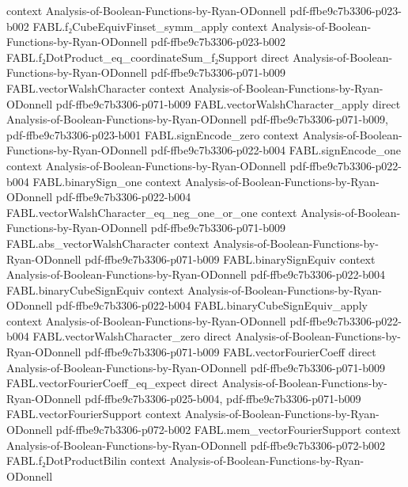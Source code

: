 \begin{theorem}
  {context}
  {Analysis-of-Boolean-Functions-by-Ryan-ODonnell}
  {pdf-ffbe9c7b3306-p023-b002}
\proofstep
  {FABL.f₂CubeEquivFinset_symm_apply}
  {context}
  {Analysis-of-Boolean-Functions-by-Ryan-ODonnell}
  {pdf-ffbe9c7b3306-p023-b002}
\proofstep
  {FABL.f₂DotProduct_eq_coordinateSum_f₂Support}
  {direct}
  {Analysis-of-Boolean-Functions-by-Ryan-ODonnell}
  {pdf-ffbe9c7b3306-p071-b009}
\proofstep
  {FABL.vectorWalshCharacter}
  {context}
  {Analysis-of-Boolean-Functions-by-Ryan-ODonnell}
  {pdf-ffbe9c7b3306-p071-b009}
\proofstep
  {FABL.vectorWalshCharacter_apply}
  {direct}
  {Analysis-of-Boolean-Functions-by-Ryan-ODonnell}
  {pdf-ffbe9c7b3306-p071-b009,
    pdf-ffbe9c7b3306-p023-b001}
\proofstep
  {FABL.signEncode_zero}
  {context}
  {Analysis-of-Boolean-Functions-by-Ryan-ODonnell}
  {pdf-ffbe9c7b3306-p022-b004}
\proofstep
  {FABL.signEncode_one}
  {context}
  {Analysis-of-Boolean-Functions-by-Ryan-ODonnell}
  {pdf-ffbe9c7b3306-p022-b004}
\proofstep
  {FABL.binarySign_one}
  {context}
  {Analysis-of-Boolean-Functions-by-Ryan-ODonnell}
  {pdf-ffbe9c7b3306-p022-b004}
\proofstep
  {FABL.vectorWalshCharacter_eq_neg_one_or_one}
  {context}
  {Analysis-of-Boolean-Functions-by-Ryan-ODonnell}
  {pdf-ffbe9c7b3306-p071-b009}
\proofstep
  {FABL.abs_vectorWalshCharacter}
  {context}
  {Analysis-of-Boolean-Functions-by-Ryan-ODonnell}
  {pdf-ffbe9c7b3306-p071-b009}
\proofstep
  {FABL.binarySignEquiv}
  {context}
  {Analysis-of-Boolean-Functions-by-Ryan-ODonnell}
  {pdf-ffbe9c7b3306-p022-b004}
\proofstep
  {FABL.binaryCubeSignEquiv}
  {context}
  {Analysis-of-Boolean-Functions-by-Ryan-ODonnell}
  {pdf-ffbe9c7b3306-p022-b004}
\proofstep
  {FABL.binaryCubeSignEquiv_apply}
  {context}
  {Analysis-of-Boolean-Functions-by-Ryan-ODonnell}
  {pdf-ffbe9c7b3306-p022-b004}
\proofstep
  {FABL.vectorWalshCharacter_zero}
  {direct}
  {Analysis-of-Boolean-Functions-by-Ryan-ODonnell}
  {pdf-ffbe9c7b3306-p071-b009}
\proofstep
  {FABL.vectorFourierCoeff}
  {direct}
  {Analysis-of-Boolean-Functions-by-Ryan-ODonnell}
  {pdf-ffbe9c7b3306-p071-b009}
\proofstep
  {FABL.vectorFourierCoeff_eq_expect}
  {direct}
  {Analysis-of-Boolean-Functions-by-Ryan-ODonnell}
  {pdf-ffbe9c7b3306-p025-b004,
    pdf-ffbe9c7b3306-p071-b009}
\proofstep
  {FABL.vectorFourierSupport}
  {context}
  {Analysis-of-Boolean-Functions-by-Ryan-ODonnell}
  {pdf-ffbe9c7b3306-p072-b002}
\proofstep
  {FABL.mem_vectorFourierSupport}
  {context}
  {Analysis-of-Boolean-Functions-by-Ryan-ODonnell}
  {pdf-ffbe9c7b3306-p072-b002}
\proofstep
  {FABL.f₂DotProductBilin}
  {context}
  {Analysis-of-Boolean-Functions-by-Ryan-ODonnell}

\end{theorem}
